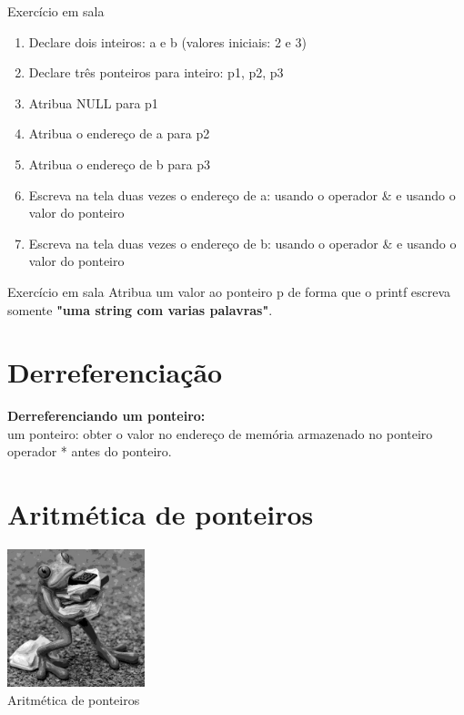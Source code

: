 \documentclass[portuguese,10pt,xcolor=table]{bredelebeamer}
\begin{document}
	\begin{frame}
		\begin{alertblock}{ Exercício em sala}
			\begin{enumerate}
				\item Declare dois inteiros: a e b (valores iniciais: 2 e 3)
				\item Declare três ponteiros para inteiro: p1, p2, p3
				\item Atribua NULL para p1
				\item Atribua o endereço de a para p2
				\item Atribua o endereço de b para p3
				\item Escreva na tela duas vezes o endereço de a: usando o operador \& e usando o valor do ponteiro
				\item Escreva na tela duas vezes o endereço de b: usando o operador \& e usando o valor do ponteiro
			\end{enumerate}
		\end{alertblock}
	\end{frame}
	
	\begin{frame}
		\begin{alertblock}{ Exercício em sala}
			Atribua um valor ao ponteiro p de forma que o printf escreva somente \textbf{"uma string com varias palavras"}.
				
		\end{alertblock}
	\end{frame}

	\section{Derreferenciação}
	\begin{frame}
		\textbf{Derreferenciando um ponteiro:}\\
				
				 um ponteiro: obter o valor no endereço de memória armazenado no ponteiro\\
				 operador * antes do ponteiro.
				\begin{center}
	\end{center}
	\end{frame}

	\section{Aritmética de ponteiros}
	\begin{frame}
		\begin{center}
			\includegraphics[height=4cm]{frog.jpg}\\
			\Large Aritmética de ponteiros
		\end{center}
	\end{frame}
\end{document}
